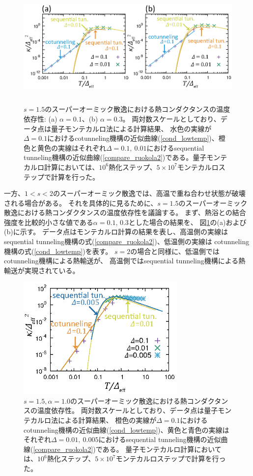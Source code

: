 \begin{figure}[tb]
	\centering
	\includegraphics[height=6.0cm]{conductance_s1.5.eps}
	\caption{
	$s=1.5$のスーパーオーミック散逸における熱コンダクタンスの温度依存性: (a) $\alpha=0.1$、(b) $\alpha=0.3$。
	両対数スケールとしており、データ点は量子モンテカルロ法による計算結果、
	水色の実線が$\Delta=0.1$におけるcotunneling機構の近似曲線(\ref{cond_lowtemp})、橙色と黄色の実線はそれぞれ$\Delta=0.1,\ 0.01$におけるsequential tunneling機構の近似曲線(\ref{compare_ruokola2})である。量子モンテカルロ計算においては、$10^6$熱化ステップ、$5\times10^7$モンテカルロステップで計算を行った。
	}
	\label{fig:conductance_s1.5}
\end{figure}

一方、$1<s<2$のスーパーオーミック散逸では、高温で重ね合わせ状態が破壊される場合がある。
それを具体的に見るために、$s=1.5$のスーパーオーミック散逸における熱コンダクタンスの温度依存性を議論する。
まず、熱浴との結合強度を比較的小さな値である$\alpha=0.1$, $0.3$とした場合の結果を、
図\ref{fig:conductance_s1.5}の(a)および(b)に示す。
データ点はモンテカルロ計算の結果を表し、高温側の実線はsequential tunneling機構の式(\ref{compare_ruokola2})、低温側の実線は
cotunneling機構の式(\ref{cond_lowtemp})を表す。
$s=2$の場合と同様に、低温側ではcotunneling機構による熱輸送が、
高温側ではsequential tunneling機構による熱輸送が実現されている。

\begin{figure}[tb]
	\centering
	\includegraphics[height=6cm]{conductance_s1.5_alpha1.0.eps}
	\caption{
	$s=1.5,\alpha=1.0$のスーパーオーミック散逸における熱コンダクタンスの温度依存性。
	両対数スケールとしており、データ点は量子モンテカルロ法による計算結果、
	橙色の実線が$\Delta=0.1$におけるcotunneling機構の近似曲線(\ref{cond_lowtemp})、黄色と青色の実線はそれぞれ$\Delta=0.01,\ 0.005$におけるsequential tunneling機構の近似曲線(\ref{compare_ruokola2})である。
	量子モンテカルロ計算においては、$10^6$熱化ステップ、$5\times10^7$モンテカルロステップで計算を行った。
	}
	\label{fig:conductance_s1.5_alpha1.0}
\end{figure}

